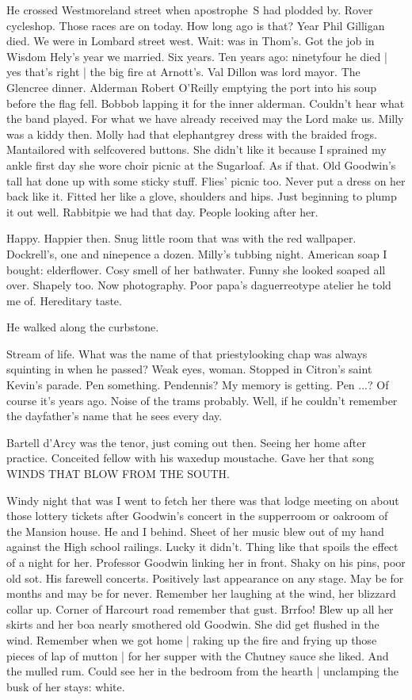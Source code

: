 He crossed Westmoreland street
when apostrophe~S had plodded by.
Rover cycleshop.
Those races are on today.
How long ago is that?
Year Phil Gilligan died.
We were in Lombard street west.
Wait:
was in Thom's.
Got the job in Wisdom Hely's year we married.
Six years.
Ten years ago:
ninetyfour he died |
yes that's right |
the big fire at Arnott's.
Val Dillon was lord mayor.
The Glencree dinner.
Alderman Robert O'Reilly emptying the port into his soup
before the flag fell.
Bobbob lapping it for the inner alderman.
Couldn't hear what the band played.
For what we have already received may the Lord make us.
Milly was a kiddy then.
Molly had that elephantgrey dress with the braided frogs.
Mantailored with selfcovered buttons.
She didn't like it because I sprained my ankle
first day she wore
choir picnic at the Sugarloaf.
As if that.
Old Goodwin's tall hat done up with some sticky stuff.
Flies' picnic too.
Never put a dress on her back like it.
Fitted her like a glove,
shoulders and hips.
Just beginning to plump it out well.
Rabbitpie we had that day.
People looking after her.

Happy.
Happier then.
Snug little room that was with the red wallpaper.
Dockrell's, one and ninepence a dozen.
Milly's tubbing night.
American soap I bought:
elderflower.
Cosy smell of her bathwater.
Funny she looked soaped all over.
Shapely too.
Now photography.
Poor papa's daguerreotype atelier he told me of.
Hereditary taste.

He walked along the curbstone.

Stream of life.
What was the name of that priestylooking chap was always squinting in
when he passed?
Weak eyes, woman.
Stopped in Citron's
saint Kevin's parade.
Pen something.
Pendennis?
My memory is getting.
Pen ...?
Of course it's years ago.
Noise of the trams probably.
Well, if he couldn't remember the dayfather's name
that he sees every day.

Bartell d'Arcy was the tenor,
just coming out then.
Seeing her home after practice.
Conceited fellow with his waxedup moustache.
Gave her that song
WINDS THAT BLOW FROM THE SOUTH.

Windy night that was I went to fetch her there
was that lodge meeting on about those lottery tickets
after Goodwin's concert in the supperroom or oakroom
of the Mansion house.
He and I behind.
Sheet of her music blew out of my hand against the High school railings.
Lucky it didn't.
Thing like that spoils the effect of a night for her.
Professor Goodwin linking her in front.
Shaky on his pins, poor old sot.
His farewell concerts.
Positively last appearance on any stage.
May be for months and may be for never.
Remember her laughing at the wind, her blizzard collar up.
Corner of Harcourt road remember that gust.
Brrfoo!
Blew up all her skirts and her boa nearly smothered old Goodwin.
She did get flushed in the wind.
Remember when we got home |
raking up the fire and frying up those pieces of lap of mutton |
for her supper with the Chutney sauce she liked.
And the mulled rum.
Could see her in the bedroom from the hearth |
unclamping the busk of her stays:
white.

